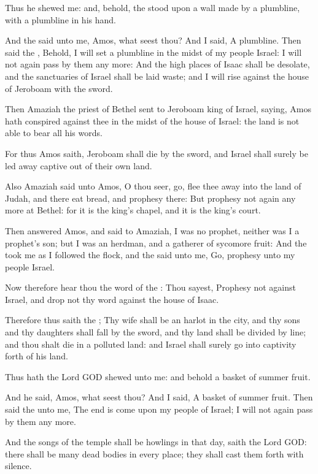 \Verse Thus he shewed me: and, behold, the \LORD stood upon a wall made by a plumbline, with a plumbline in his hand.

\Verse And the \LORD said unto me, Amos, what seest thou? And I said, A plumbline. Then said the \LORD, Behold, I will set a plumbline in the midst of my people Israel: I will not again pass by them any more: \Verse And the high places of Isaac shall be desolate, and the sanctuaries of Israel shall be laid waste; and I will rise against the house of Jeroboam with the sword.

\Verse Then Amaziah the priest of Bethel sent to Jeroboam king of Israel, saying, Amos hath conspired against thee in the midst of the house of Israel: the land is not able to bear all his words.

\Verse For thus Amos saith, Jeroboam shall die by the sword, and Israel shall surely be led away captive out of their own land.

\Verse Also Amaziah said unto Amos, O thou seer, go, flee thee away into the land of Judah, and there eat bread, and prophesy there: \Verse But prophesy not again any more at Bethel: for it is the king's chapel, and it is the king's court.

\Verse Then answered Amos, and said to Amaziah, I was no prophet, neither was I a prophet's son; but I was an herdman, and a gatherer of sycomore fruit: \Verse And the \LORD took me as I followed the flock, and the \LORD said unto me, Go, prophesy unto my people Israel.

\Verse Now therefore hear thou the word of the \LORD: Thou sayest, Prophesy not against Israel, and drop not thy word against the house of Isaac.

\Verse Therefore thus saith the \LORD; Thy wife shall be an harlot in the city, and thy sons and thy daughters shall fall by the sword, and thy land shall be divided by line; and thou shalt die in a polluted land: and Israel shall surely go into captivity forth of his land.


\Chapter
\Verse Thus hath the Lord GOD shewed unto me: and behold a basket of summer fruit.

\Verse And he said, Amos, what seest thou? And I said, A basket of summer fruit. Then said the \LORD unto me, The end is come upon my people of Israel; I will not again pass by them any more.

\Verse And the songs of the temple shall be howlings in that day, saith the Lord GOD: there shall be many dead bodies in every place; they shall cast them forth with silence.

